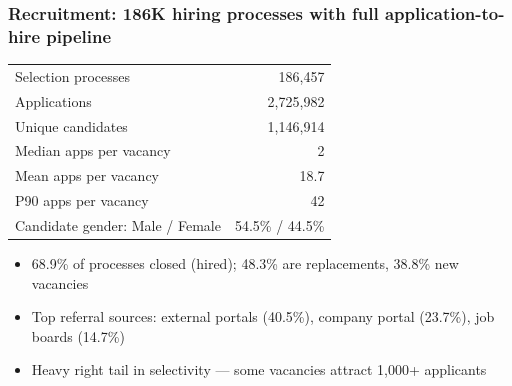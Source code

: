 \documentclass[aspectratio=169, 11pt]{beamer}
\begin{document}
\begin{frame}
\frametitle{Recruitment: 186K hiring processes with full application-to-hire pipeline}

\begin{center}
\small
\begin{tabular}{@{}lr@{}}
\toprule
Selection processes & 186,457 \\
Applications & 2,725,982 \\
Unique candidates & 1,146,914 \\
\midrule
Median apps per vacancy & 2 \\
Mean apps per vacancy & 18.7 \\
P90 apps per vacancy & 42 \\
\midrule
Candidate gender: Male / Female & 54.5\% / 44.5\% \\
\bottomrule
\end{tabular}
\end{center}

\vspace{0.3cm}
\begin{itemize}
    \item 68.9\% of processes closed (hired); 48.3\% are replacements, 38.8\% new vacancies
    \item Top referral sources: external portals (40.5\%), company portal (23.7\%), job boards (14.7\%)
    \item Heavy right tail in selectivity --- some vacancies attract 1,000+ applicants 
\end{itemize}


\end{frame}
\end{document}

